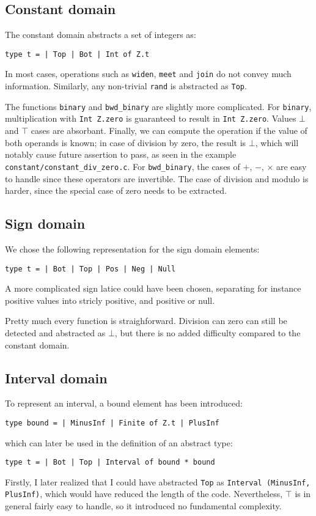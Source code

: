 \documentclass[12pt,a4paper]{article}
\begin{document}
\subsection{Constant domain}
The constant domain abstracts a set of integers as:
\begin{center}
    \texttt{type t = | Top | Bot | Int of Z.t}
\end{center}
In most cases, operations such as \texttt{widen}, \texttt{meet} and \texttt{join} do not convey much information. Similarly, any non-trivial \texttt{rand} is abstracted as \texttt{Top}.

The functions \texttt{binary} and \texttt{bwd\_binary} are slightly more complicated. For \texttt{binary}, multiplication with \texttt{Int Z.zero} is guaranteed to result in \texttt{Int Z.zero}. Values $\bot$ and $\top$ cases are absorbant. Finally, we can compute the operation if the value of both operands is known; in case of division by zero, the result is $\bot$, which will notably cause future assertion to pass, as seen in the example \texttt{constant/constant\_div\_zero.c}. For \texttt{bwd\_binary}, the cases of $+$, $-$, $\times$ are easy to handle since these operators are invertible. The case of division and modulo is harder, since the special case of zero needs to be extracted.

\subsection{Sign domain}
We chose the following representation for the sign domain elements:
\begin{center}
    \texttt{type t = | Bot | Top | Pos | Neg | Null}
\end{center}
A more complicated sign latice could have been chosen, separating for instance positive values into stricly positive, and positive or null.

Pretty much every function is straighforward. Division can zero can still be detected and abstracted as $\bot$, but there is no added difficulty compared to the constant domain.

\subsection{Interval domain}
To represent an interval, a bound element has been introduced:
\begin{center}
    \texttt{type bound = | MinusInf | Finite of Z.t | PlusInf}
\end{center}
which can later be used in the definition of an abstract type:
\begin{center}
    \texttt{type t  = | Bot | Top | Interval of bound * bound}
\end{center}
Firstly, I later realized that I could have abstracted \texttt{Top} as \texttt{Interval (MinusInf, PlusInf)}, which would have reduced the length of the code. Nevertheless, $\top$ is in general fairly easy to handle, so it introduced no fundamental complexity.
\end{document}
